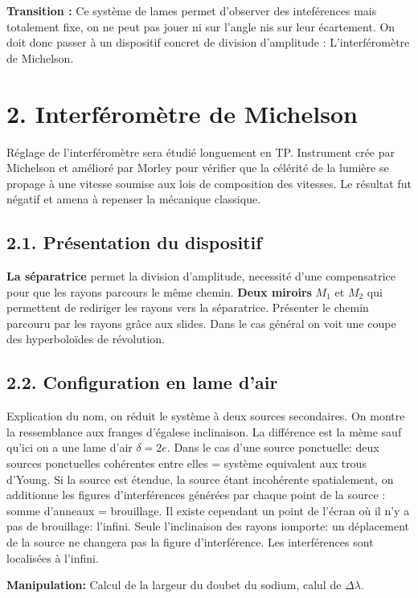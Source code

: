 \documentclass[french, a4paper, 10pt, twocolumn, landscape]{article}
\begin{document}
\textbf{Transition :} Ce système de lames permet d'observer des inteférences mais totalement fixe, on ne peut pas jouer ni sur l'angle nis sur leur écartement. On doit donc passer à un dispositif concret de division d'amplitude : L'interféromètre de Michelson.

\section*{2. Interféromètre de Michelson}

Réglage de l'interféromètre sera étudié longuement en TP. Instrument crée par Michelson et amélioré par Morley pour vérifier que la célérité de la lumière se propage à une vitesse soumise aux lois de composition des vitesses. Le résultat fut négatif et amena à repenser la mécanique classique.
\subsection*{2.1. Présentation du dispositif}

\textbf{La séparatrice} permet la division d'amplitude, necessité d'une compensatrice pour que les rayons parcours le même chemin. \textbf{Deux miroirs} $M_1$ et $M_2$ qui permettent de rediriger les rayons vers la séparatrice. Présenter le chemin parcouru par les rayons grâce aux slides. Dans le cas général on voit une coupe des hyperboloïdes de révolution. 


\subsection*{2.2. Configuration en lame d'air}
Explication du nom, on réduit le système à deux sources secondaires. On montre la ressemblance aux franges d'égalese inclinaison. La différence est la mème sauf qu'ici on a une lame d'air $\delta = 2e$. Dans le cas d'une source ponctuelle: deux sources ponctuelles cohérentes entre elles = système 
equivalent aux trous d'Young. Si la source est étendue, la source étant incohérente spatialement, on additionne les figures d'interférences générées par chaque point de la source : somme d'anneaux = brouillage. Il existe cependant un point de l'écran où il n'y a pas de brouillage: l'infini. Seule l'inclinaison des rayons iomporte: un déplacement de la source ne changera pas la figure d'interférence. Les interférences sont localisées à l'infini. 

\textbf{Manipulation:} Calcul de la largeur du doubet du sodium, calul de $\Delta \lambda$.\medskip
\end{document}
